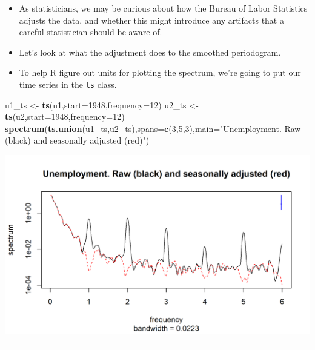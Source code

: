 \documentclass[]{article}
\newenvironment{Shaded}{\begin{snugshade}}{\end{snugshade}}
\newcommand{\KeywordTok}[1]{\textcolor[rgb]{0.13,0.29,0.53}{\textbf{#1}}}
\newcommand{\DataTypeTok}[1]{\textcolor[rgb]{0.13,0.29,0.53}{#1}}
\newcommand{\DecValTok}[1]{\textcolor[rgb]{0.00,0.00,0.81}{#1}}
\newcommand{\StringTok}[1]{\textcolor[rgb]{0.31,0.60,0.02}{#1}}
\newcommand{\NormalTok}[1]{#1}
\begin{document}
\begin{itemize}
\item
  As statisticians, we may be curious about how the Bureau of Labor
  Statistics adjusts the data, and whether this might introduce any
  artifacts that a careful statistician should be aware of.
\item
  Let's look at what the adjustment does to the smoothed periodogram.
\item
  To help R figure out units for plotting the spectrum, we're going to
  put our time series in the \texttt{ts} class.
\end{itemize}

\begin{Shaded}
\begin{Highlighting}[]
\NormalTok{u1_ts <-}\StringTok{ }\KeywordTok{ts}\NormalTok{(u1,}\DataTypeTok{start=}\DecValTok{1948}\NormalTok{,}\DataTypeTok{frequency=}\DecValTok{12}\NormalTok{)}
\NormalTok{u2_ts <-}\StringTok{ }\KeywordTok{ts}\NormalTok{(u2,}\DataTypeTok{start=}\DecValTok{1948}\NormalTok{,}\DataTypeTok{frequency=}\DecValTok{12}\NormalTok{)}
\KeywordTok{spectrum}\NormalTok{(}\KeywordTok{ts.union}\NormalTok{(u1_ts,u2_ts),}\DataTypeTok{spans=}\KeywordTok{c}\NormalTok{(}\DecValTok{3}\NormalTok{,}\DecValTok{5}\NormalTok{,}\DecValTok{3}\NormalTok{),}\DataTypeTok{main=}\StringTok{"Unemployment. Raw (black) and seasonally adjusted (red)"}\NormalTok{)}
\end{Highlighting}
\end{Shaded}

\begin{center}\includegraphics{figure/intro-adjustment_spectrum-1} \end{center}

\begin{center}\rule{0.5\linewidth}{\linethickness}\end{center}
\end{document}
